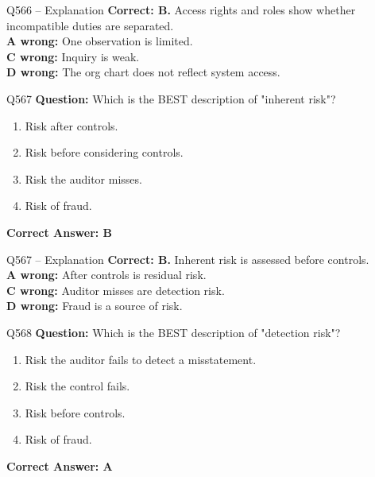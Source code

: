 \documentclass[aspectratio=169,10pt]{beamer}
\begin{document}
	\begin{frame}[t]{Q566 -- Explanation}
		\small
		\textbf{Correct: B.} Access rights and roles show whether incompatible duties are separated. \\[4pt]
		\textbf{A wrong:} One observation is limited. \\[2pt]
		\textbf{C wrong:} Inquiry is weak. \\[2pt]
		\textbf{D wrong:} The org chart does not reflect system access.
	\end{frame}
	
	\begin{frame}[t]{Q567}
		\small
		\textbf{Question:} Which is the BEST description of "inherent risk"?
		\begin{enumerate}[label=\Alph*.,itemsep=1pt,topsep=2pt]
			\item Risk after controls.
			\item Risk before considering controls.
			\item Risk the auditor misses.
			\item Risk of fraud.
		\end{enumerate}
		\vspace{4pt}
		\textbf{Correct Answer: B}
	\end{frame}
	
	\begin{frame}[t]{Q567 -- Explanation}
		\small
		\textbf{Correct: B.} Inherent risk is assessed before controls. \\[4pt]
		\textbf{A wrong:} After controls is residual risk. \\[2pt]
		\textbf{C wrong:} Auditor misses are detection risk. \\[2pt]
		\textbf{D wrong:} Fraud is a source of risk.
	\end{frame}
	
	\begin{frame}[t]{Q568}
		\small
		\textbf{Question:} Which is the BEST description of "detection risk"?
		\begin{enumerate}[label=\Alph*.,itemsep=1pt,topsep=2pt]
			\item Risk the auditor fails to detect a misstatement.
			\item Risk the control fails.
			\item Risk before controls.
			\item Risk of fraud.
		\end{enumerate}
		\vspace{4pt}
		\textbf{Correct Answer: A}
	\end{frame}
	
\end{document}
